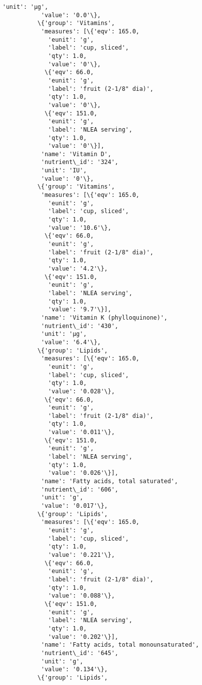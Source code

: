 \documentclass[11pt]{article}
\begin{document}
\begin{Verbatim}[commandchars=\\\{\}]
           'unit': 'µg',
           'value': '0.0'\},
          \{'group': 'Vitamins',
           'measures': [\{'eqv': 165.0,
             'eunit': 'g',
             'label': 'cup, sliced',
             'qty': 1.0,
             'value': '0'\},
            \{'eqv': 66.0,
             'eunit': 'g',
             'label': 'fruit (2-1/8" dia)',
             'qty': 1.0,
             'value': '0'\},
            \{'eqv': 151.0,
             'eunit': 'g',
             'label': 'NLEA serving',
             'qty': 1.0,
             'value': '0'\}],
           'name': 'Vitamin D',
           'nutrient\_id': '324',
           'unit': 'IU',
           'value': '0'\},
          \{'group': 'Vitamins',
           'measures': [\{'eqv': 165.0,
             'eunit': 'g',
             'label': 'cup, sliced',
             'qty': 1.0,
             'value': '10.6'\},
            \{'eqv': 66.0,
             'eunit': 'g',
             'label': 'fruit (2-1/8" dia)',
             'qty': 1.0,
             'value': '4.2'\},
            \{'eqv': 151.0,
             'eunit': 'g',
             'label': 'NLEA serving',
             'qty': 1.0,
             'value': '9.7'\}],
           'name': 'Vitamin K (phylloquinone)',
           'nutrient\_id': '430',
           'unit': 'µg',
           'value': '6.4'\},
          \{'group': 'Lipids',
           'measures': [\{'eqv': 165.0,
             'eunit': 'g',
             'label': 'cup, sliced',
             'qty': 1.0,
             'value': '0.028'\},
            \{'eqv': 66.0,
             'eunit': 'g',
             'label': 'fruit (2-1/8" dia)',
             'qty': 1.0,
             'value': '0.011'\},
            \{'eqv': 151.0,
             'eunit': 'g',
             'label': 'NLEA serving',
             'qty': 1.0,
             'value': '0.026'\}],
           'name': 'Fatty acids, total saturated',
           'nutrient\_id': '606',
           'unit': 'g',
           'value': '0.017'\},
          \{'group': 'Lipids',
           'measures': [\{'eqv': 165.0,
             'eunit': 'g',
             'label': 'cup, sliced',
             'qty': 1.0,
             'value': '0.221'\},
            \{'eqv': 66.0,
             'eunit': 'g',
             'label': 'fruit (2-1/8" dia)',
             'qty': 1.0,
             'value': '0.088'\},
            \{'eqv': 151.0,
             'eunit': 'g',
             'label': 'NLEA serving',
             'qty': 1.0,
             'value': '0.202'\}],
           'name': 'Fatty acids, total monounsaturated',
           'nutrient\_id': '645',
           'unit': 'g',
           'value': '0.134'\},
          \{'group': 'Lipids',

\end{Verbatim}
\end{document}
